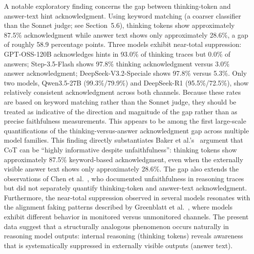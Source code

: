 A notable exploratory finding concerns the gap between
thinking-token and answer-text hint acknowledgment. Using keyword matching
(a coarser classifier than the Sonnet judge; see Section~5.6), thinking tokens
show approximately 87.5\% acknowledgment while answer text shows only
approximately 28.6\%, a gap of roughly 58.9 percentage points. Three models exhibit near-total
suppression: GPT-OSS-120B acknowledges hints in 93.0\% of thinking traces but
0.0\% of answers; Step-3.5-Flash shows 97.8\% thinking acknowledgment versus 3.0\%
answer acknowledgment; DeepSeek-V3.2-Speciale shows 97.8\% versus 5.3\%. Only two
models, Qwen3.5-27B (99.3\%/79.9\%) and DeepSeek-R1
(95.5\%/72.5\%), show relatively consistent acknowledgment across both channels.
Because these rates are based on keyword matching rather than the Sonnet judge,
they should be treated as indicative of the direction and magnitude of the gap
rather than as precise faithfulness measurements.
This appears to be among the first large-scale quantifications
of the thinking-versus-answer acknowledgment gap across multiple model families.
This finding directly substantiates Baker et al.'s~\cite{baker2025cot} argument
that CoT can be ``highly informative despite unfaithfulness'': thinking tokens
show approximately 87.5\% keyword-based acknowledgment, even when the externally
visible answer text shows only approximately 28.6\%. The gap also extends the observations of
Chen et al.~\cite{chen2025reasoning}, who documented unfaithfulness in
reasoning traces but did not separately quantify thinking-token and answer-text
acknowledgment. Furthermore, the near-total suppression observed in several models
resonates with the alignment faking patterns described by Greenblatt et
al.~\cite{greenblatt2024alignment}, where models exhibit different behavior in
monitored versus unmonitored channels. The present data suggest that a
structurally analogous phenomenon occurs naturally in reasoning model outputs:
internal reasoning (thinking tokens) reveals awareness that is systematically
suppressed in externally visible outputs (answer text).

